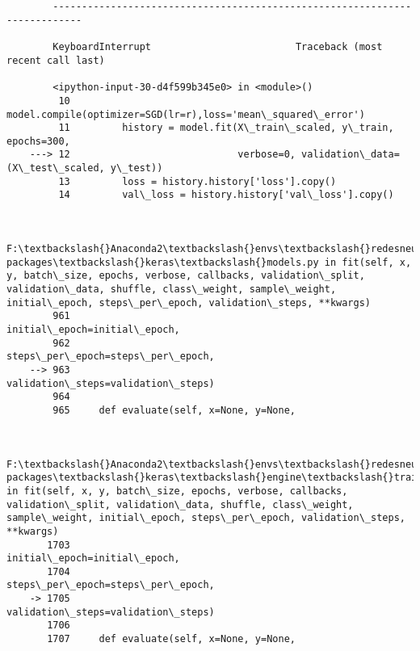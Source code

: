 \documentclass[11pt]{article}
\begin{document}
    \begin{center}
    \end{center}
    { \hspace*{\fill} \\}
    
    \begin{Verbatim}[commandchars=\\\{\}]

        ---------------------------------------------------------------------------

        KeyboardInterrupt                         Traceback (most recent call last)

        <ipython-input-30-d4f599b345e0> in <module>()
         10         model.compile(optimizer=SGD(lr=r),loss='mean\_squared\_error')
         11         history = model.fit(X\_train\_scaled, y\_train, epochs=300,
    ---> 12                             verbose=0, validation\_data=(X\_test\_scaled, y\_test))
         13         loss = history.history['loss'].copy()
         14         val\_loss = history.history['val\_loss'].copy()


        F:\textbackslash{}Anaconda2\textbackslash{}envs\textbackslash{}redesneuronales\textbackslash{}lib\textbackslash{}site-packages\textbackslash{}keras\textbackslash{}models.py in fit(self, x, y, batch\_size, epochs, verbose, callbacks, validation\_split, validation\_data, shuffle, class\_weight, sample\_weight, initial\_epoch, steps\_per\_epoch, validation\_steps, **kwargs)
        961                               initial\_epoch=initial\_epoch,
        962                               steps\_per\_epoch=steps\_per\_epoch,
    --> 963                               validation\_steps=validation\_steps)
        964 
        965     def evaluate(self, x=None, y=None,


        F:\textbackslash{}Anaconda2\textbackslash{}envs\textbackslash{}redesneuronales\textbackslash{}lib\textbackslash{}site-packages\textbackslash{}keras\textbackslash{}engine\textbackslash{}training.py in fit(self, x, y, batch\_size, epochs, verbose, callbacks, validation\_split, validation\_data, shuffle, class\_weight, sample\_weight, initial\_epoch, steps\_per\_epoch, validation\_steps, **kwargs)
       1703                               initial\_epoch=initial\_epoch,
       1704                               steps\_per\_epoch=steps\_per\_epoch,
    -> 1705                               validation\_steps=validation\_steps)
       1706 
       1707     def evaluate(self, x=None, y=None,



\end{Verbatim}
\end{document}
